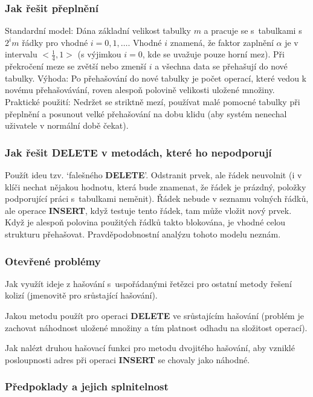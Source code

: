 \documentclass[a4paper,12pt]{article}
\begin{document}
\subsubsection{Jak řešit přeplnění}
Standardní model: Dána základní velikost tabulky $m$ a 
pracuje se s~tabulkami s~$2^im$ řádky pro vhodné 
$i=0,1,\dots$. Vhodné $i$ znamená, že faktor zaplnění $
\alpha$ je v 
intervalu $<\frac 14,1>$ (s výjimkou $i=0$, kde se uvažuje 
pouze horní mez). Při překro\-če\-ní meze se zvětší nebo 
zmenší $i$ a všechna data se přehašují do nové 
tabulky.\newline 
Výhoda: Po přehašování do nové tabulky je počet operací, 
které vedou k novému přehašová\-vá\-ní, roven alespoň polovině 
velikosti uložené množiny.\newline 
Praktické použití: Nedržet se striktně mezí, používat 
malé pomocné ta\-bul\-ky při přeplnění a posunout velké 
přehašování na dobu klidu (aby systém nenechal uživatele v 
normální době čekat).

\subsubsection{Jak řešit DELETE v metodách, které ho 
nepodporují}
Použít ideu tzv. `falešného {\bf DELETE}'. 
Odstranit prvek, ale řádek neuvolnit (i v klíči nechat 
nějakou hodnotu, která bude znamenat, že řádek je 
prázdný, položky podporující práci s~tabulkami neměnit). 
Řádek nebude v seznamu volných řádků, ale 
operace {\bf INSERT}, když testuje tento řádek, tam 
může vložit nový prvek. Když je alespoň 
polovina použitých řádků takto blokována, je 
vhodné celou strukturu přehašovat. Prav\-děpodobnostní 
analýzu tohoto modelu neznám.

\subsubsection{Otevřené problémy}

Jak využít ideje z hašování s~uspořádanými 
řetězci pro ostatní metody řešení kolizí 
(jmeno\-vitě pro srůstající hašování).

Jakou metodu použít pro operaci {\bf DELETE} ve 
srůstajícím hašování (problém je zachovat náhodnost 
uložené množiny a tím platnost odhadu na složitost operací). 

Jak nalézt druhou hašovací funkci pro metodu 
dvojitého hašo\-vá\-ní, aby vzniklé posloupnosti adres při operaci 
{\bf INSERT} se chovaly jako náhodné.

\subsubsection{Předpoklady a jejich splnitelnost}
\end{document}
